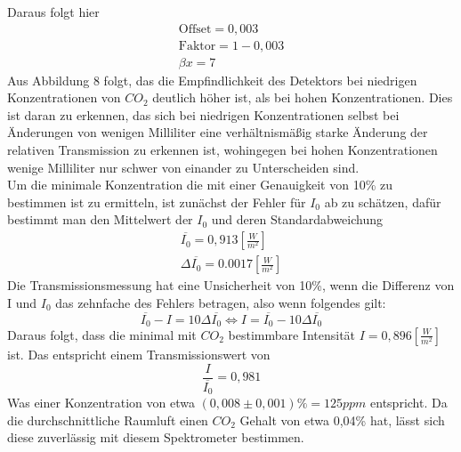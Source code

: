 \documentclass{article}
\begin{document}
            Daraus folgt hier
            \begin{equation}
                \begin{aligned}
                    \text{Offset} = 0,003\\
                    \text{Faktor} = 1-0,003\\
                    \beta x = 7
                \end{aligned}    
            \end{equation}
            Aus Abbildung 8 folgt, das die Empfindlichkeit des Detektors bei 
            niedrigen Konzentrationen von $CO_2$ deutlich höher ist, als bei hohen Konzentrationen.
            Dies ist daran zu erkennen, das sich bei niedrigen Konzentrationen selbst bei Änderungen
            von wenigen Milliliter eine verhältnismäßig starke Änderung der relativen Transmission zu erkennen ist,
            wohingegen bei hohen Konzentrationen wenige Milliliter nur schwer von einander zu Unterscheiden sind.\\
            Um die minimale Konzentration die mit einer Genauigkeit von 10\% zu bestimmen ist zu ermitteln,
            ist zunächst der Fehler für $I_0$ ab zu schätzen, dafür bestimmt man den Mittelwert der $I_0$ und deren
            Standardabweichung
            \begin{equation}
                \begin{aligned}
                    \overline{I_0} = 0,913 [\frac{W}{m^2}]\\
                    \Delta \overline{I_0} = 0.0017 [\frac{W}{m^2}]
                \end{aligned}
            \end{equation}
            Die Transmissionsmessung hat eine Unsicherheit von
            10\%, wenn die Differenz von I und $I_0$ das zehnfache des Fehlers betragen, also wenn folgendes gilt:
            \begin{equation}
                \overline{I_0} - I = 10 \Delta \overline{I_0} \Leftrightarrow I = \overline{I_0} - 10 \Delta \overline{I_0}
            \end{equation}
            Daraus folgt, dass die minimal mit $CO_2$ bestimmbare Intensität $I = 0,896 [\frac{W}{m^2}]$ ist.
            Das entspricht einem Transmissionswert von 
            \begin{equation}
                \frac{I}{\overline{I_0}} = 0,981
            \end{equation}
            Was einer Konzentration von etwa $(0,008\pm0,001)\% = 125ppm$ entspricht.
            Da die durchschnittliche Raumluft einen $CO_2$ Gehalt von etwa 0,04\% hat,
            lässt sich diese zuverlässig mit diesem Spektrometer bestimmen.
            
\end{document}
